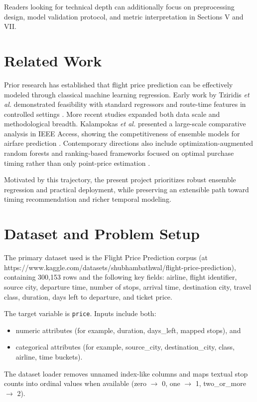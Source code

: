 \documentclass[conference]{IEEEtran}
\begin{document}
Readers looking for technical depth can additionally focus on preprocessing design, model validation protocol, and metric interpretation in Sections V and VII.

\section{Related Work}
Prior research has established that flight price prediction can be effectively modeled through classical machine learning regression. Early work by Tziridis \textit{et al.} demonstrated feasibility with standard regressors and route-time features in controlled settings \cite{tziridis2017}. More recent studies expanded both data scale and methodological breadth. Kalampokas \textit{et al.} presented a large-scale comparative analysis in IEEE Access, showing the competitiveness of ensemble models for airfare prediction \cite{kalampokas2023}. Contemporary directions also include optimization-augmented random forests \cite{yang2025} and ranking-based frameworks focused on optimal purchase timing rather than only point-price estimation \cite{oglakcioglu2023}.

Motivated by this trajectory, the present project prioritizes robust ensemble regression and practical deployment, while preserving an extensible path toward timing recommendation and richer temporal modeling.

\section{Dataset and Problem Setup}
The primary dataset used is the Flight Price Prediction corpus (at https://www.kaggle.com/datasets/shubhambathwal/flight-price-prediction), containing 300,153 rows and the following key fields: airline, flight identifier, source city, departure time, number of stops, arrival time, destination city, travel class, duration, days left to departure, and ticket price.

The target variable is \texttt{price}. Inputs include both:
\begin{itemize}
\item numeric attributes (for example, duration, days\_left, mapped stops), and
\item categorical attributes (for example, source\_city, destination\_city, class, airline, time buckets).
\end{itemize}

The dataset loader removes unnamed index-like columns and maps textual stop counts into ordinal values when available (zero $\to$ 0, one $\to$ 1, two\_or\_more $\to$ 2).
\end{document}
